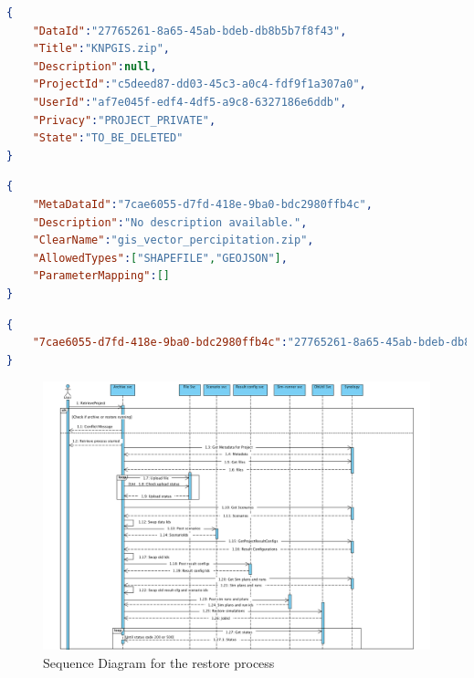 \begin{lstlisting}[caption={Snippet of the uploaded MARS metadata resource}, language=json,firstnumber=1, captionpos=b, label={lst:marsNewMetadata}]
{
    "DataId":"27765261-8a65-45ab-bdeb-db8b5b7f8f43",
    "Title":"KNPGIS.zip",
    "Description":null,
    "ProjectId":"c5deed87-dd03-45c3-a0c4-fdf9f1a307a0",
    "UserId":"af7e045f-edf4-4df5-a9c8-6327186e6ddb",
    "Privacy":"PROJECT_PRIVATE",
    "State":"TO_BE_DELETED"
}
\end{lstlisting}

\begin{lstlisting}[caption={Snippet of the archived MARS scenario resource}, language=json,firstnumber=1, captionpos=b, label={lst:marsScenario}]
{
    "MetaDataId":"7cae6055-d7fd-418e-9ba0-bdc2980ffb4c",
    "Description":"No description available.",
    "ClearName":"gis_vector_percipitation.zip",
    "AllowedTypes":["SHAPEFILE","GEOJSON"],
    "ParameterMapping":[]
}
\end{lstlisting}

\begin{lstlisting}[caption={The mapped key value attributes that the scenario metadata would need}, language=json,firstnumber=1, captionpos=b, label={lst:marsMap}]
{
    "7cae6055-d7fd-418e-9ba0-bdc2980ffb4c":"27765261-8a65-45ab-bdeb-db8b5b7f8f4"
}
    \end{lstlisting}

\begin{figure}[H]
    \centering \includegraphics[scale=0.5, angle=90, origin=c]{grafiken/sequenceRestore.png}
    \caption{Sequence Diagram for the restore process}
    \label{fig:sequenceRestore}
\end{figure}
    
